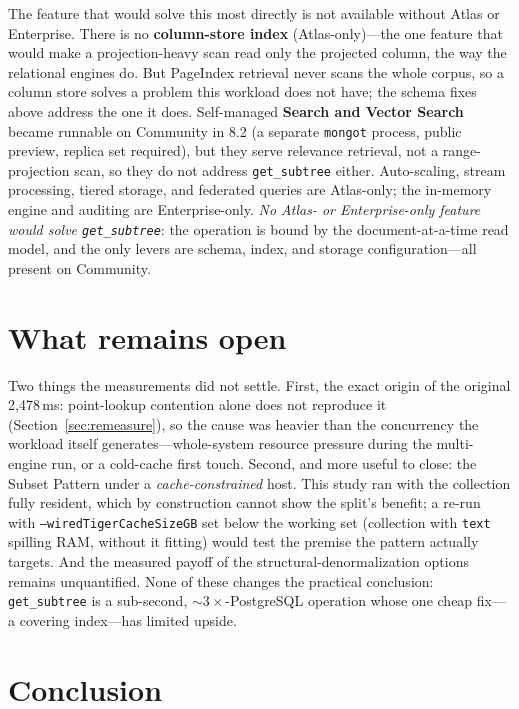 \documentclass[11pt]{article}
\newcommand{\code}[1]{\texttt{#1}}
\begin{document}
The feature that would solve this most directly is not available without Atlas or
Enterprise. There is no \textbf{column-store index} (Atlas-only)---the one feature
that would make a projection-heavy scan read only the projected column, the way
the relational engines do. But PageIndex retrieval never scans the whole corpus,
so a column store solves a problem this workload does not have; the schema fixes
above address the one it does. Self-managed \textbf{Search and Vector Search}
became runnable on Community in 8.2 (a separate \code{mongot} process, public
preview, replica set required), but they serve relevance retrieval, not a
range-projection scan, so they do not address \code{get\_subtree} either.
Auto-scaling, stream processing, tiered storage, and federated queries are
Atlas-only; the in-memory engine and auditing are Enterprise-only. \emph{No Atlas-
or Enterprise-only feature would solve \code{get\_subtree}}: the operation is bound
by the document-at-a-time read model, and the only levers are schema, index, and
storage configuration---all present on Community.

\section{What remains open}\label{sec:open}

Two things the measurements did not settle. First, the exact origin of the
original 2{,}478\,ms: point-lookup contention alone does not reproduce it
(Section~\ref{sec:remeasure}), so the cause was heavier than the concurrency the
workload itself generates---whole-system resource pressure during the multi-engine
run, or a cold-cache first touch. Second, and more useful to close: the Subset
Pattern under a \emph{cache-constrained} host. This study ran with the collection
fully resident, which by construction cannot show the split's benefit; a re-run
with \code{--wiredTigerCacheSizeGB} set below the working set (collection with
\code{text} spilling RAM, without it fitting) would test the premise the pattern
actually targets. And the measured payoff of the structural-denormalization
options remains unquantified. None of these changes the practical conclusion:
\code{get\_subtree} is a sub-second, ${\sim}3\times$-PostgreSQL operation whose one
cheap fix---a covering index---has limited upside.

\section{Conclusion}
\end{document}
